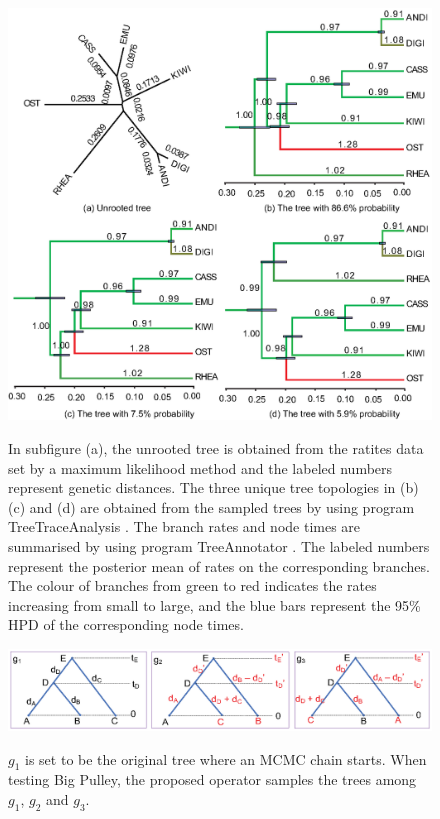 \documentclass{bmcart}
\begin{document}
\begin{backmatter}
\begin{figure}[h!]
\includegraphics[width=12cm]{Fig12-fixedtree.eps}\\
\caption{
            In subfigure (a), the unrooted tree is obtained from the ratites data set \cite{cooper2001complete} by a maximum likelihood method \cite{phyml} and the labeled numbers represent genetic distances. The three unique tree topologies in (b) (c) and (d) are obtained from the sampled trees by using program TreeTraceAnalysis \cite{TreeTraceAnalysis}. The branch rates and node times are summarised by using program TreeAnnotator \cite{TreeAnnotator}. The labeled numbers represent the posterior mean of rates on the corresponding branches. The colour of branches from green to red indicates the rates increasing from small to large, and the blue bars represent the 95\% HPD of the corresponding node times.}
\label{withoutdata}
\end{figure}

\begin{figure}[h!]
\includegraphics[width=12cm]{Fig13-sampleprior.eps}\\
\caption{
             $g_1$ is set to be the original tree where an MCMC chain starts. When testing Big Pulley, the proposed operator samples the trees among $g_1$, $g_2$ and $g_3$.}
\label{sampleprior}
\end{figure}


\end{backmatter}
\end{document}
